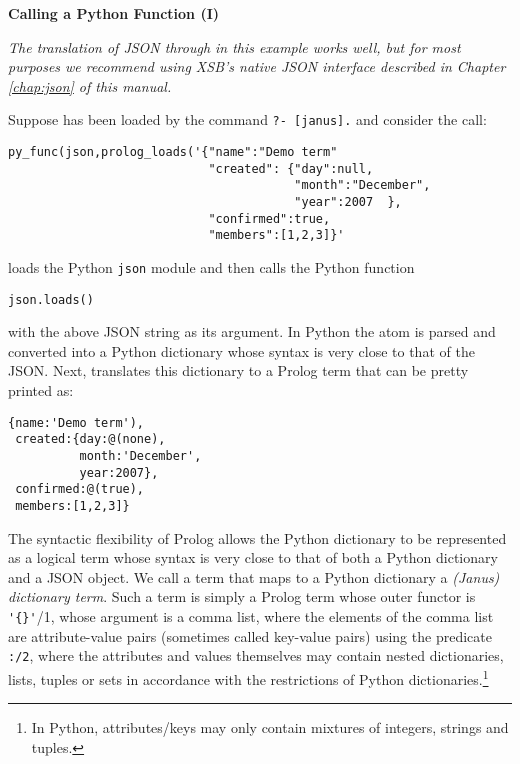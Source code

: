 \begin{example} \rm {\bf Calling a Python Function (I)} \label{ex:janus-json}

  {{\em The translation of JSON through \janusplg{} in this example
      works well, but for most purposes we recommend using XSB's native
      JSON interface described in Chapter \ref{chap:json} of this
      manual.  }}

Suppose \janus{} has been loaded by the command {\tt ?- [janus].} and
consider the call:

\begin{verbatim}
py_func(json,prolog_loads('{"name":"Demo term"
                            "created": {"day":null,
                                        "month":"December",
                                        "year":2007  },
                            "confirmed":true,
                            "members":[1,2,3]}'
\end{verbatim}
 
\noindent 
loads the Python {\tt json} module
and then calls the Python function

{\tt json.loads()}

\noindent
with the above JSON string as its argument.
In Python the atom is parsed and converted into a Python dictionary
whose syntax is very close to that of the JSON.  Next, \janus{}
translates this dictionary to a Prolog term that can be pretty
printed as:
\begin{verbatim}
{name:'Demo term'),
 created:{day:@(none),
          month:'December',
          year:2007},
 confirmed:@(true),
 members:[1,2,3]}
\end{verbatim}
The syntactic flexibility of Prolog allows the Python dictionary to be
represented as a logical term whose syntax is very close to that of
both a Python dictionary and a JSON object.  We call a term that maps
to a Python dictionary a {\em (Janus) dictionary term}.  Such a term is
simply a Prolog term whose outer functor is \verb|'{}'|/1, whose
argument is a comma list, where the elements of the comma list are
attribute-value pairs (sometimes called key-value pairs) using the
predicate {\tt :/2}, where the attributes and values themselves may
contain nested dictionaries, lists, tuples or sets in accordance with
the restrictions of Python dictionaries.\footnote{In Python,
attributes/keys may only contain mixtures of integers, strings and tuples.}
\end{example}

